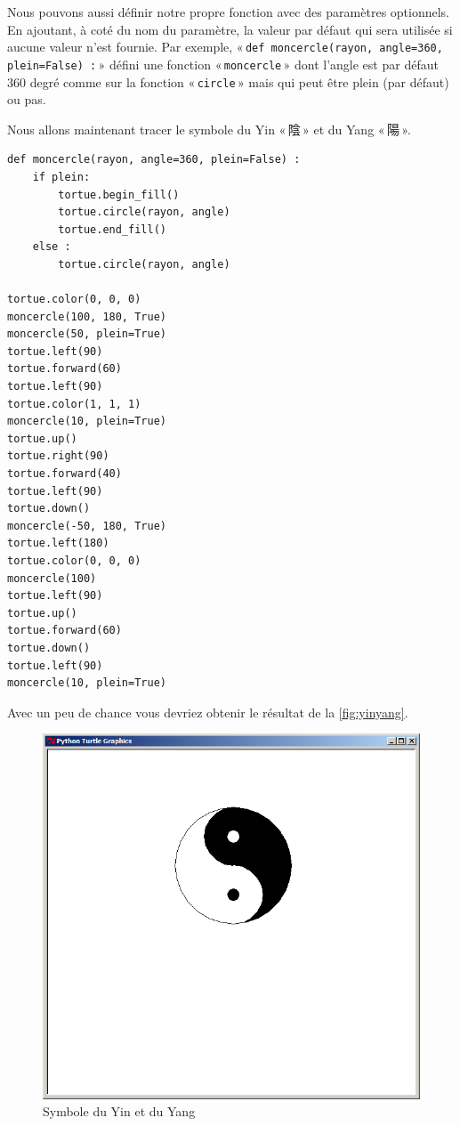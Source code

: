Nous pouvons aussi définir notre propre fonction avec des paramètres optionnels. En ajoutant, à coté du nom du paramètre, la valeur par défaut qui sera utilisée si aucune valeur n'est fournie.  Par exemple, « \texttt{def moncercle(rayon, angle=360, plein=False) :} » défini une fonction « \texttt{moncercle} »  dont l'angle est par défaut 360 degré comme sur la fonction « \texttt{circle} » mais qui peut être plein (par défaut) ou pas.


Nous allons maintenant tracer le symbole du Yin « {陰} »  et du Yang « {陽} ».

\begin{Verbatim}[frame=single,rulecolor=\color{mbleu}, label=à taper]
def moncercle(rayon, angle=360, plein=False) :
    if plein:
        tortue.begin_fill()
        tortue.circle(rayon, angle)
        tortue.end_fill()
    else :
        tortue.circle(rayon, angle)

tortue.color(0, 0, 0)
moncercle(100, 180, True)
moncercle(50, plein=True)
tortue.left(90)
tortue.forward(60)
tortue.left(90)
tortue.color(1, 1, 1)
moncercle(10, plein=True)
tortue.up()
tortue.right(90)
tortue.forward(40)
tortue.left(90)
tortue.down()
moncercle(-50, 180, True)
tortue.left(180)
tortue.color(0, 0, 0)
moncercle(100)
tortue.left(90)
tortue.up()
tortue.forward(60)
tortue.down()
tortue.left(90)
moncercle(10, plein=True)
\end{Verbatim}

Avec un peu de chance vous devriez obtenir le résultat de la \autoref{fig:yinyang}.

\begin{figure}[h!]
\centering
\includegraphics[scale=0.4]{images/yinyang}
\caption{Symbole du Yin et du Yang}\label{fig:yinyang}
\end{figure}

